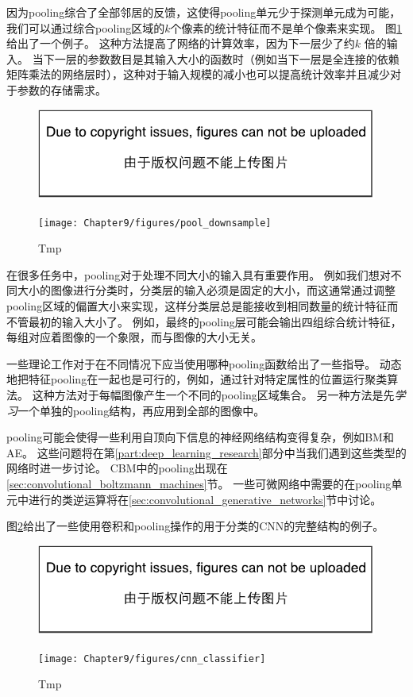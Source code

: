 因为\gls{pooling}综合了全部邻居的反馈，这使得\gls{pooling}单元少于探测单元成为可能，我们可以通过综合\gls{pooling}区域的$k$个像素的统计特征而不是单个像素来实现。
图\ref{fig:chap9_pool_downsample}给出了一个例子。
这种方法提高了网络的计算效率，因为下一层少了约$k$ 倍的输入。
当下一层的参数数目是其输入大小的函数时（例如当下一层是全连接的依赖矩阵乘法的网络层时），这种对于输入规模的减小也可以提高统计效率并且减少对于参数的存储需求。
\begin{figure}[!htb]
\ifOpenSource
\centerline{\includegraphics{figure.pdf}}
\else
\centerline{\texttt{[image: Chapter9/figures/pool\_downsample]}}
\fi
\caption{Tmp}
\label{fig:chap9_pool_downsample}
\end{figure}

 
在很多任务中，\gls{pooling}对于处理不同大小的输入具有重要作用。
例如我们想对不同大小的图像进行分类时，分类层的输入必须是固定的大小，而这通常通过调整\gls{pooling}区域的偏置大小来实现，这样分类层总是能接收到相同数量的统计特征而不管最初的输入大小了。
例如，最终的\gls{pooling}层可能会输出四组综合统计特征，每组对应着图像的一个象限，而与图像的大小无关。

一些理论工作对于在不同情况下应当使用哪种\gls{pooling}函数给出了一些指导\citep{boureau-icml-10}。
动态地把特征\gls{pooling}在一起也是可行的，例如，通过针对特定属性的位置运行聚类算法\citep{boureau-iccv-11}。
这种方法对于每幅图像产生一个不同的\gls{pooling}区域集合。
另一种方法是先\emph{学习}一个单独的\gls{pooling}结构，再应用到全部的图像中\citep{jia2012beyond}。

\gls{pooling}可能会使得一些利用自顶向下信息的神经网络结构变得复杂，例如\gls{BM}和\gls{AE}。
这些问题将在第\ref{part:deep_learning_research}部分中当我们遇到这些类型的网络时进一步讨论。
\gls{CBM}中的\gls{pooling}出现在\ref{sec:convolutional_boltzmann_machines}节。
一些可微网络中需要的在\gls{pooling}单元中进行的类逆运算将在\ref{sec:convolutional_generative_networks}节中讨论。

图\ref{fig:chap9_cnn_classifier}给出了一些使用卷积和\gls{pooling}操作的用于分类的\gls{CNN}的完整结构的例子。
\begin{figure}[!htb]
\ifOpenSource
\centerline{\includegraphics{figure.pdf}}
\else
\centerline{\texttt{[image: Chapter9/figures/cnn\_classifier]}}
\fi
\caption{Tmp}
\label{fig:chap9_cnn_classifier}
\end{figure}

